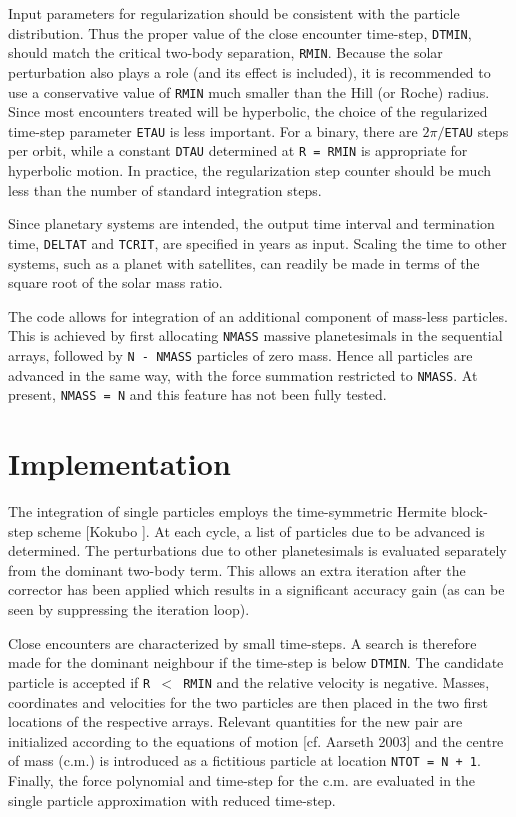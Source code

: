 \documentclass[12pt]{article}
\begin{document}
Input parameters for regularization should be consistent with the
particle distribution.
Thus the proper value of the close encounter time-step, {\tt DTMIN},
should match the critical two-body separation, {\tt RMIN}.
Because the solar perturbation also plays a role (and its effect is
included), it is recommended to use a conservative value of {\tt RMIN}
much smaller than the Hill (or Roche) radius.
Since most encounters treated will be hyperbolic, the choice of the
regularized time-step parameter {\tt ETAU} is less important.
For a binary, there are $2 \pi/${\tt ETAU} steps per orbit, while a
constant {\tt DTAU} determined at {\tt R = RMIN} is appropriate for
hyperbolic motion.
In practice, the regularization step counter should be much less than
the number of standard integration steps.

Since planetary systems are intended, the output time interval and
termination time, {\tt DELTAT} and {\tt TCRIT}, are specified in years
as input.
Scaling the time to other systems, such as a planet with satellites,
can readily be made in terms of the square root of the solar mass
ratio.

The code allows for integration of an additional component of mass-less
particles.
This is achieved by first allocating {\tt NMASS} massive planetesimals 
in the sequential arrays, followed by {\tt N - NMASS} particles of
zero mass.
Hence all particles are advanced in the same way, with the force
summation restricted to {\tt NMASS}.
At present, {\tt NMASS = N} and this feature has not been fully tested.

\section{Implementation}

The integration of single particles employs the time-symmetric Hermite
block-step scheme [Kokubo ].
At each cycle, a list of particles due to be advanced is determined.
The perturbations due to other planetesimals is evaluated separately
from the dominant two-body term.
This allows an extra iteration after the corrector has been applied which
results in a significant accuracy gain (as can be seen by suppressing
the iteration loop).

Close encounters are characterized by small time-steps.
A search is therefore made for the dominant neighbour if the time-step is
below {\tt DTMIN}.
The candidate particle is accepted if {\tt R $<$ RMIN} and the relative velocity
is negative.
Masses, coordinates and velocities for the two particles are then placed in
the two first locations of the respective arrays.
Relevant quantities for the new pair are initialized according to the equations
of motion [cf. Aarseth 2003] and the centre of mass (c.m.) is introduced as a
fictitious particle at location {\tt NTOT = N + 1}.
Finally, the force polynomial and time-step for the c.m. are evaluated in
the single particle approximation with reduced time-step.
\end{document}
